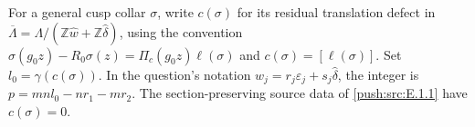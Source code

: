 For a general cusp collar $\sigma$, write $c(\sigma)$ for
its residual translation defect in
$\overline\Lambda=\Lambda/(\mathbb Z\widehat w+
\mathbb Z\widehat\delta)$, using the convention
$\sigma(g_0z)-R_0\sigma(z)=\Pi_c(g_0z)\ell(\sigma)$
and $c(\sigma)=[\ell(\sigma)]$.
Set $l_0=\gamma(c(\sigma))$.  In the question's notation
$w_j=r_j\varepsilon_j+s_j\widehat\delta$, the integer is
$p=mn l_0-nr_1-mr_2$.
The section-preserving source data of \ref{push:src:E.1.1} have $c(\sigma)=0$.

